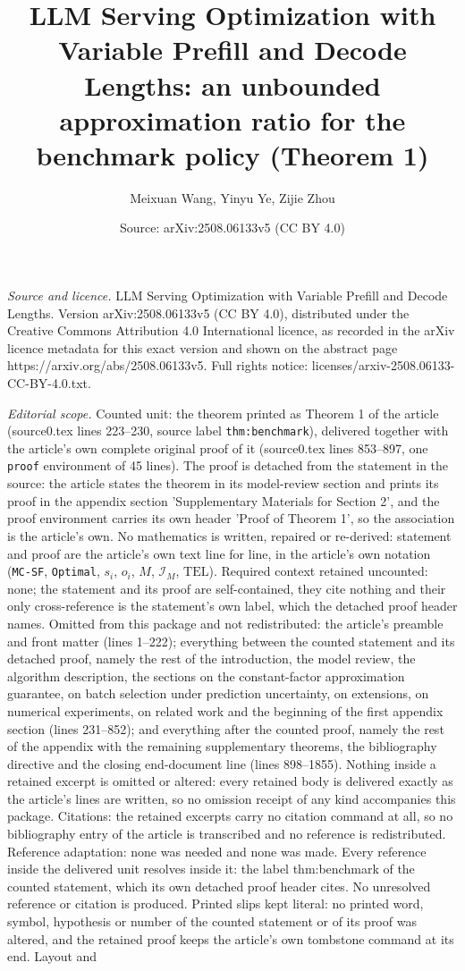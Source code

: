 \documentclass[10pt,a4paper]{amsart}
\title[The benchmark policy can perform arbitrarily poorly (Theorem 1)]{LLM Serving Optimization with Variable Prefill and Decode Lengths: an unbounded approximation ratio for the benchmark policy (Theorem 1)}
\author{Meixuan Wang, Yinyu Ye, Zijie Zhou}
\date{Source: arXiv:2508.06133v5 (CC BY 4.0)}
\newcommand{\mcsdf}{\texttt{MC-SF}}
\newcommand{\opt}{\texttt{Optimal}}
\begin{document}
\maketitle

\noindent\emph{Source and licence.} LLM Serving Optimization with Variable Prefill and Decode Lengths. Version arXiv:2508.06133v5 (CC BY 4.0), distributed under the Creative Commons Attribution 4.0 International licence, as recorded in the arXiv licence metadata for this exact version and shown on the abstract page https://arxiv.org/abs/2508.06133v5. Full rights notice: licenses/arxiv-2508.06133-CC-BY-4.0.txt.\par\smallskip

\noindent\textit{Editorial scope.} Counted unit: the theorem printed as Theorem 1 of the article (source0.tex lines 223--230, source label \texttt{thm:benchmark}), delivered together with the article's own complete original proof of it (source0.tex lines 853--897, one \texttt{proof} environment of 45 lines). The proof is detached from the statement in the source: the article states the theorem in its model-review section and prints its proof in the appendix section 'Supplementary Materials for Section 2', and the proof environment carries its own header 'Proof of Theorem 1', so the association is the article's own. No mathematics is written, repaired or re-derived: statement and proof are the article's own text line for line, in the article's own notation (\mcsdf{}, \opt{}, $s_i$, $o_i$, $M$, $\mathcal I_M$, $\mathrm{TEL}$). Required context retained uncounted: none; the statement and its proof are self-contained, they cite nothing and their only cross-reference is the statement's own label, which the detached proof header names. Omitted from this package and not redistributed: the article's preamble and front matter (lines 1--222); everything between the counted statement and its detached proof, namely the rest of the introduction, the model review, the algorithm description, the sections on the constant-factor approximation guarantee, on batch selection under prediction uncertainty, on extensions, on numerical experiments, on related work and the beginning of the first appendix section (lines 231--852); and everything after the counted proof, namely the rest of the appendix with the remaining supplementary theorems, the bibliography directive and the closing end-document line (lines 898--1855). Nothing inside a retained excerpt is omitted or altered: every retained body is delivered exactly as the article's lines are written, so no omission receipt of any kind accompanies this package. Citations: the retained excerpts carry no citation command at all, so no bibliography entry of the article is transcribed and no reference is redistributed. Reference adaptation: none was needed and none was made. Every reference inside the delivered unit resolves inside it: the label thm:benchmark of the counted statement, which its own detached proof header cites. No unresolved reference or citation is produced. Printed slips kept literal: no printed word, symbol, hypothesis or number of the counted statement or of its proof was altered, and the retained proof keeps the article's own tombstone command at its end. Layout and 
\end{document}
